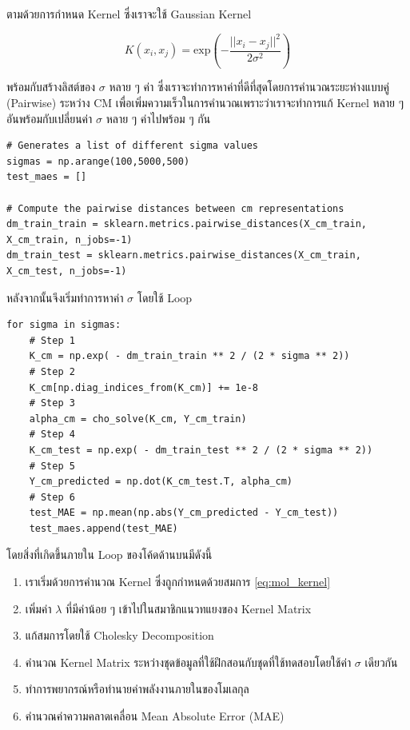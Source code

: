 \noindent ตามด้วยการกำหนด Kernel ซึ่งเราจะใช้ Gaussian Kernel 

\begin{equation}\label{eq:gaussian_kernel}
    K(x_{i}, x_{j}) = \mathrm{exp}\left( -\frac{||x_i-x_j||^2}{2\sigma^2} \right)
\end{equation}

\noindent พร้อมกับสร้างลิสต์ของ $\sigma$ หลาย ๆ ค่า ซึ่งเราจะทำการหาค่าที่ดีที่สุดโดยการคำนวณระยะห่างแบบคู่ (Pairwise) ระหว่าง CM 
เพื่อเพิ่มความเร็วในการคำนวณเพราะว่าเราจะทำการแก้ Kernel หลาย ๆ อันพร้อมกับเปลี่ยนค่า $\sigma$ หลาย ๆ ค่าไปพร้อม ๆ กัน

\begin{lstlisting}[style=MyPython]
# Generates a list of different sigma values
sigmas = np.arange(100,5000,500) 
test_maes = []

# Compute the pairwise distances between cm representations
dm_train_train = sklearn.metrics.pairwise_distances(X_cm_train, X_cm_train, n_jobs=-1)
dm_train_test = sklearn.metrics.pairwise_distances(X_cm_train, X_cm_test, n_jobs=-1)
\end{lstlisting}

\noindent หลังจากนั้นจึงเริ่มทำการหาค่า $\sigma$ โดยใช้ Loop

\begin{lstlisting}[style=MyPython]
for sigma in sigmas:
    # Step 1
    K_cm = np.exp( - dm_train_train ** 2 / (2 * sigma ** 2)) 
    # Step 2
    K_cm[np.diag_indices_from(K_cm)] += 1e-8
    # Step 3
    alpha_cm = cho_solve(K_cm, Y_cm_train)
    # Step 4
    K_cm_test = np.exp( - dm_train_test ** 2 / (2 * sigma ** 2))
    # Step 5
    Y_cm_predicted = np.dot(K_cm_test.T, alpha_cm)
    # Step 6
    test_MAE = np.mean(np.abs(Y_cm_predicted - Y_cm_test))
    test_maes.append(test_MAE)
\end{lstlisting}

โดยสิ่งที่เกิดขึ้นภายใน Loop ของโค้ดด้านบนมีดังนี้

\begin{enumerate}[noitemsep]
    \item เราเริ่มด้วยการคำนวณ Kernel ซึ่งถูกกำหนดด้วยสมการ \ref{eq:mol_kernel}
    
    \item เพิ่มค่า $\lambda$ ที่มีค่าน้อย ๆ เข้าไปในสมาชิกแนวทแยงของ Kernel Matrix
    
    \item แก้สมการโดยใช้ Cholesky Decomposition
    
    \item คำนวณ Kernel Matrix ระหว่างชุดข้อมูลที่ใช้ฝึกสอนกับชุดที่ใช้ทดสอบโดยใช้ค่า $\sigma$ เดียวกัน
    
    \item ทำการพยากรณ์หรือทำนายค่าพลังงานภายในของโมเลกุล
    
    \item คำนวณค่าความคลาดเคลื่อน Mean Absolute Error (MAE)
\end{enumerate}

